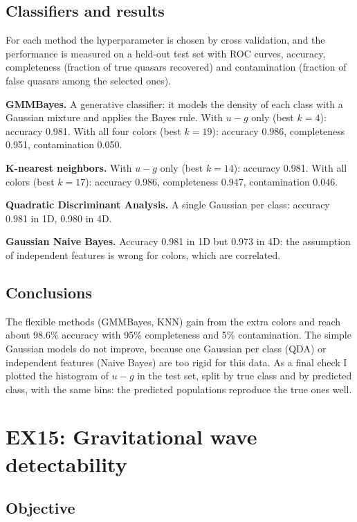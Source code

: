 \documentclass[11pt]{article}
\begin{document}
\subsection*{Classifiers and results}

For each method the hyperparameter is chosen by cross validation, and the performance is measured on a held-out test set with ROC curves, accuracy, completeness (fraction of true quasars recovered) and contamination (fraction of false quasars among the selected ones).

\textbf{GMMBayes.} A generative classifier: it models the density of each class with a Gaussian mixture and applies the Bayes rule. With $u-g$ only (best $k=4$): accuracy 0.981. With all four colors (best $k=19$): accuracy 0.986, completeness 0.951, contamination 0.050.

\textbf{K-nearest neighbors.} With $u-g$ only (best $k=14$): accuracy 0.981. With all colors (best $k=17$): accuracy 0.986, completeness 0.947, contamination 0.046.

\textbf{Quadratic Discriminant Analysis.} A single Gaussian per class: accuracy 0.981 in 1D, 0.980 in 4D.

\textbf{Gaussian Naive Bayes.} Accuracy 0.981 in 1D but 0.973 in 4D: the assumption of independent features is wrong for colors, which are correlated.

\subsection*{Conclusions}

The flexible methods (GMMBayes, KNN) gain from the extra colors and reach about 98.6\% accuracy with 95\% completeness and 5\% contamination. The simple Gaussian models do not improve, because one Gaussian per class (QDA) or independent features (Naive Bayes) are too rigid for this data. As a final check I plotted the histogram of $u-g$ in the test set, split by true class and by predicted class, with the same bins: the predicted populations reproduce the true ones well.

\section{EX15: Gravitational wave detectability}

\subsection*{Objective}
\end{document}
